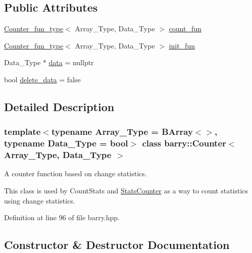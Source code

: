 \subsection*{Public Attributes}
\begin{DoxyCompactItemize}
\item 
\hyperlink{namespacebarry_abaaae3200da8e4b7faac3c04fe9c3081}{Counter\+\_\+fun\+\_\+type}$<$ Array\+\_\+\+Type, Data\+\_\+\+Type $>$ \hyperlink{classbarry_1_1_counter_aa535e164838a3a9c780e8d15fe45679b}{count\+\_\+fun}
\item 
\hyperlink{namespacebarry_abaaae3200da8e4b7faac3c04fe9c3081}{Counter\+\_\+fun\+\_\+type}$<$ Array\+\_\+\+Type, Data\+\_\+\+Type $>$ \hyperlink{classbarry_1_1_counter_a2509d75d3fc9e33d708911a38373d8ab}{init\+\_\+fun}
\item 
Data\+\_\+\+Type $\ast$ \hyperlink{classbarry_1_1_counter_af8196eeaaa4b58b788969c07aee7f1ee}{data} = nullptr
\item 
bool \hyperlink{classbarry_1_1_counter_a5445fa47abeff4b5675a5e5c12e4917a}{delete\+\_\+data} = false
\end{DoxyCompactItemize}


\subsection{Detailed Description}
\subsubsection*{template$<$typename Array\+\_\+\+Type = B\+Array$<$$>$, typename Data\+\_\+\+Type = bool$>$\newline
class barry\+::\+Counter$<$ Array\+\_\+\+Type, Data\+\_\+\+Type $>$}

A counter function based on change statistics. 

This class is used by {\ttfamily Count\+Stats} and {\ttfamily \hyperlink{classbarry_1_1_stats_counter}{Stats\+Counter}} as a way to count statistics using change statistics. 

Definition at line 96 of file barry.\+hpp.



\subsection{Constructor \& Destructor Documentation}
\mbox{\label{classbarry_1_1_counter_a3c990d6dbcdc553b3179c8353497a7df}} 
